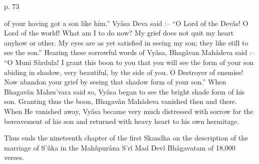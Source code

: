  

p. 73

 

of your having got a son like him.” Vyâsa Deva said :-- “O Lord of the Devâs! O Lord of the world! What am I to do now? My grief does not quit my heart anyhow or other. My eyes are as yet satisfied in seeing my son; they like still to see the son.” Hearing these sorrowful words of Vyâsa, Bhagâvan Mahâdeva said :-- “O Muni Sârdula! I grant this boon to you that you will see the form of your son abiding in shadow, very beautiful, by the side of you. O Destroyer of enemies! Now abandon your grief by seeing that shadow form of your son.” When Bhagavân Mahes'vara said so, Vyâsa began to see the bright shade form of his son. Granting thus the boon, Bhagavân Mahâdeva vanished then and there. When He vanished away, Vyâsa became very much distressed with sorrow for the bereavement of his son and returned with heavy heart to his own hermitage.

 

Thus ends the nineteenth chapter of the first Skandha on the description of the marriage of S’ûka in the Mahâpurâna S'rî Mad Devî Bhâgavatam of 18,000 verses.